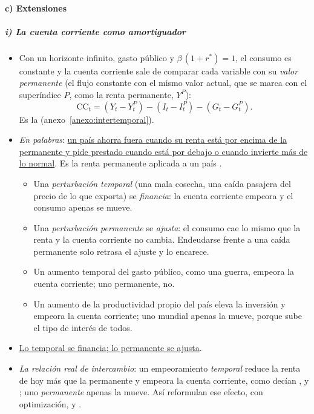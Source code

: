 \documentclass[11pt]{article}
\begin{document}
\paragraph{c) Extensiones}

\subparagraph{i) La cuenta corriente como amortiguador}

\begin{itemize}
\item Con un horizonte infinito, gasto público y $\beta\,(1+r^*)=1$, el consumo es constante y la cuenta corriente sale de comparar cada variable con su \emph{valor permanente} (el flujo constante con el mismo valor actual, que se marca con el superíndice $P$, como la renta permanente, $Y^P$)\nocite{ObstfeldRogoff1996Foundations}:
  \begin{equation}\label{eq:cc-fundamental}
  \mathrm{CC}_t=\left(Y_t-Y^P_t\right)-\left(I_t-I^P_t\right)-\left(G_t-G^P_t\right).
  \end{equation}
  Es la  (anexo~\ref{anexo:intertemporal}).
\item \emph{En palabras}: \uline{un país ahorra fuera cuando su renta está por encima de la permanente y pide prestado cuando está por debajo o cuando invierte más de lo normal}. Es la renta permanente aplicada a un país .
  \begin{itemize}
  \item Una \emph{perturbación temporal} (una mala cosecha, una caída pasajera del precio de lo que exporta) se \emph{financia}: la cuenta corriente empeora y el consumo apenas se mueve.
  \item Una \emph{perturbación permanente} se \emph{ajusta}: el consumo cae lo mismo que la renta y la cuenta corriente no cambia. Endeudarse frente a una caída permanente solo retrasa el ajuste y lo encarece.
  \item Un aumento temporal del gasto público, como una guerra, empeora la cuenta corriente; uno permanente, no.
  \item Un aumento de la productividad propio del país eleva la inversión y empeora la cuenta corriente; uno mundial apenas la mueve, porque sube el tipo de interés de todos\nocite{GlickRogoff1995Global}.
  \end{itemize}
\item \uline{Lo temporal se financia; lo permanente se ajusta}.
\item \emph{La relación real de intercambio}: un empeoramiento \emph{temporal} reduce la renta de hoy más que la permanente y empeora la cuenta corriente, como decían ,  y ; uno \emph{permanente} apenas la mueve. Así reformulan ese efecto, con optimización, \textcite{Obstfeld1982Aggregate} y \textcite{SvenssonRazin1983}.
\end{itemize}
\end{document}
